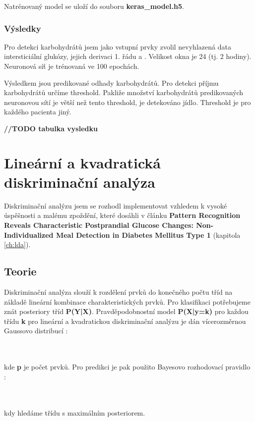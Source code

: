 Natrénovaný model se uloží do souboru \textbf{keras\_model.h5}.

\subsubsection{Výsledky}

Pro detekci karbohydrátů jsem jako vstupní prvky zvolil nevyhlazená data intersticiální glukózy, jejich derivaci 1. řádu a . Velikost okna je 24 (tj. 2 hodiny). Neuronová síť je trénovaná ve 100 epochách.

Výsledkem jsou predikované odhady karbohydrátů. Pro detekci příjmu karbohydrátů určíme threshold. Pakliže množství karbohydrátů predikovaných neuronovou sítí je větší než tento threshold, je detekováno jídlo. Threshold je pro každého pacienta jiný.

\textbf{//TODO tabulka vysledku}

\section{Lineární a kvadratická diskriminační analýza}
\label{ch:lda_qda}

Diskriminační analýzu jsem se rozhodl implementovat vzhledem k vysoké úspěšnosti a malému zpoždění, které dosáhli \citet{Analyza.LDA} v článku \textbf{Pattern Recognition Reveals Characteristic Postprandial Glucose Changes: Non-Individualized Meal Detection in Diabetes Mellitus Type 1} (kapitola \ref{ch:lda}).

\subsection{Teorie}
Diskriminační analýza slouží k rozdělení prvků do konečného počtu tříd na základě lineární kombinace charakteristických prvků. Pro klasifikaci potřebujeme znát posteriory tříd \textbf{P(Y|X)}. Pravděpodobnostní model \textbf{P(X|y=k)} pro každou třídu \textbf{k} pro lineární a kvadratickou diskriminační analýzu je dán vícerozměrnou Gaussovo distribucí \citep{cho.book.lda}:

\\\\
kde \textbf{p} je počet prvků. Pro predikci je pak použito Bayesovo rozhodovací pravidlo \citep{cho.book.lda}:

\\\\
kdy hledáme třídu s maximálním posteriorem.

